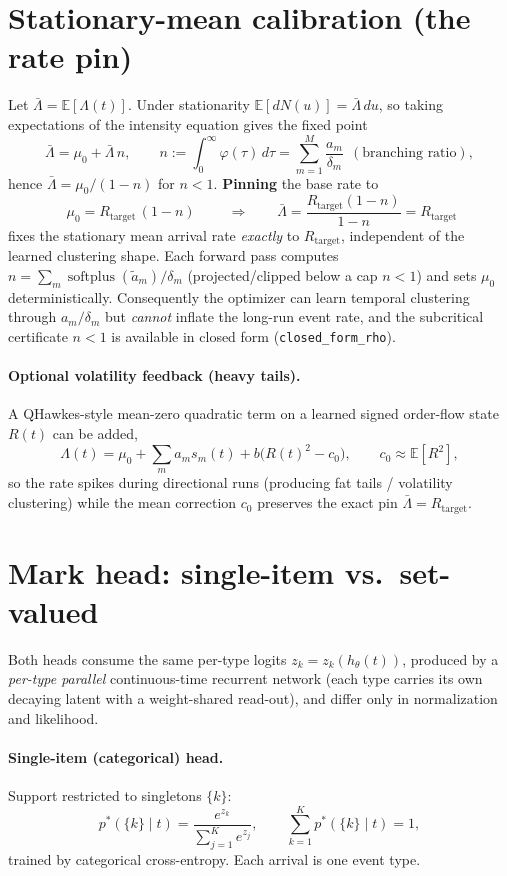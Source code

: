 \documentclass[11pt]{article}
\newcommand{\Lam}{\Lambda}
\newcommand{\softplus}{\operatorname{softplus}}
\begin{document}
\section{Stationary-mean calibration (the rate pin)}\label{sec:pin}
Let $\bar\Lam=\mathbb{E}[\Lam(t)]$. Under stationarity $\mathbb{E}[dN(u)]=\bar\Lam\,du$, so taking
expectations of the intensity equation gives the fixed point
\[
\bar\Lam=\mu_0+\bar\Lam\,n,\qquad
n:=\int_0^\infty\varphi(\tau)\,d\tau=\sum_{m=1}^{M}\frac{a_m}{\delta_m}\ \ (\text{branching ratio}),
\]
hence $\bar\Lam=\mu_0/(1-n)$ for $n<1$. \textbf{Pinning} the base rate to
\[
\boxed{\;\mu_0=R_{\mathrm{target}}\,(1-n)\;}
\qquad\Longrightarrow\qquad
\bar\Lam=\frac{R_{\mathrm{target}}(1-n)}{1-n}=R_{\mathrm{target}}
\]
fixes the stationary mean arrival rate \emph{exactly} to $R_{\mathrm{target}}$, independent of the
learned clustering shape. Each forward pass computes
$n=\sum_m \softplus(\tilde a_m)/\delta_m$ (projected/clipped below a cap $n<1$) and sets
$\mu_0$ deterministically. Consequently the optimizer can learn temporal clustering through
$a_m/\delta_m$ but \emph{cannot} inflate the long-run event rate, and the subcritical
certificate $n<1$ is available in closed form (\texttt{closed\_form\_rho}).

\paragraph{Optional volatility feedback (heavy tails).}
A QHawkes-style mean-zero quadratic term on a learned signed order-flow state $R(t)$ can be added,
\[
\Lam(t)=\mu_0+\sum_m a_m s_m(t)+b\bigl(R(t)^2-c_0\bigr),\qquad c_0\approx\mathbb{E}[R^2],
\]
so the rate spikes during directional runs (producing fat tails / volatility clustering) while the
mean correction $c_0$ preserves the exact pin $\bar\Lam=R_{\mathrm{target}}$.

\section{Mark head: single-item vs.\ set-valued}\label{sec:mark}
Both heads consume the same per-type logits $z_k=z_k(h_\theta(t))$, produced by a
\emph{per-type parallel} continuous-time recurrent network (each type carries its own decaying
latent with a weight-shared read-out), and differ only in normalization and likelihood.

\paragraph{Single-item (categorical) head.} Support restricted to singletons $\{k\}$:
\[
p^*(\{k\}\mid t)=\frac{e^{z_k}}{\sum_{j=1}^{K}e^{z_j}},\qquad
\sum_{k=1}^{K}p^*(\{k\}\mid t)=1,
\]
trained by categorical cross-entropy. Each arrival is one event type.
\end{document}
